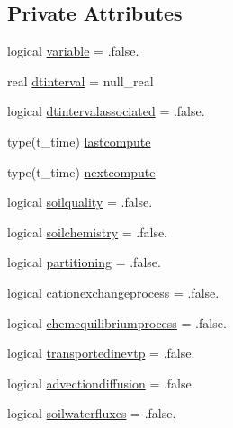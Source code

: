 \subsection*{Private Attributes}
\begin{DoxyCompactItemize}
\item 
logical \mbox{\hyperlink{structmoduleporousmediaproperties_1_1t__evolution_a54309717a798227dfe2281ccf48b22e9}{variable}} = .false.
\item 
real \mbox{\hyperlink{structmoduleporousmediaproperties_1_1t__evolution_a2610b6bdbd9c7bd62566dba01da4b525}{dtinterval}} = null\+\_\+real
\item 
logical \mbox{\hyperlink{structmoduleporousmediaproperties_1_1t__evolution_a77ea1ae282aec265b3af32b9736db449}{dtintervalassociated}} = .false.
\item 
type(t\+\_\+time) \mbox{\hyperlink{structmoduleporousmediaproperties_1_1t__evolution_a72d95b038701a63f3362db5c5b07d546}{lastcompute}}
\item 
type(t\+\_\+time) \mbox{\hyperlink{structmoduleporousmediaproperties_1_1t__evolution_acdb36a8f8731739df6c9ee90c628c78e}{nextcompute}}
\item 
logical \mbox{\hyperlink{structmoduleporousmediaproperties_1_1t__evolution_ab4d0b8986e8d2902a346f632ca9f2e89}{soilquality}} = .false.
\item 
logical \mbox{\hyperlink{structmoduleporousmediaproperties_1_1t__evolution_a2ebd43d62e0cabaa4eb66a84afb7c324}{soilchemistry}} = .false.
\item 
logical \mbox{\hyperlink{structmoduleporousmediaproperties_1_1t__evolution_a7ef5e50b467c937820480350a037eb60}{partitioning}} = .false.
\item 
logical \mbox{\hyperlink{structmoduleporousmediaproperties_1_1t__evolution_ab336c399477eed3d97ba8f56d2953613}{cationexchangeprocess}} = .false.
\item 
logical \mbox{\hyperlink{structmoduleporousmediaproperties_1_1t__evolution_a6dae0902dfe642360ddf4482ecb542c7}{chemequilibriumprocess}} = .false.
\item 
logical \mbox{\hyperlink{structmoduleporousmediaproperties_1_1t__evolution_a106afd41e39a148f7614429a61ae0f23}{transportedinevtp}} = .false.
\item 
logical \mbox{\hyperlink{structmoduleporousmediaproperties_1_1t__evolution_abe2465e05b47e9a0faaf83c1fd7157b8}{advectiondiffusion}} = .false.
\item 
logical \mbox{\hyperlink{structmoduleporousmediaproperties_1_1t__evolution_a6bd0daecbac6b01fea2585e847da2850}{soilwaterfluxes}} = .false.

\end{DoxyCompactItemize}

